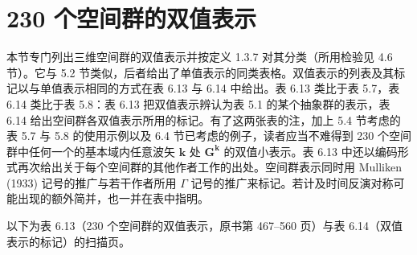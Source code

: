 \section{230 个空间群的双值表示}

本节专门列出三维空间群的双值表示并按定义 1.3.7 对其分类（所用检验见 4.6 节）。它与 5.2 节类似，后者给出了单值表示的同类表格。双值表示的列表及其标记以与单值表示相同的方式在表 6.13 与 6.14 中给出。表 6.13 类比于表 5.7，表 6.14 类比于表 5.8：表 6.13 把双值表示辨认为表 5.1 的某个抽象群的表示，表 6.14 给出空间群各双值表示所用的标记。有了这两张表的注，加上 5.4 节考虑的表 5.7 与 5.8 的使用示例以及 6.4 节已考虑的例子，读者应当不难得到 230 个空间群中任何一个的基本域内任意波矢 $\mathbf{k}$ 处 $\mathbf{G}^{\mathbf{k}}$ 的双值小表示。表 6.13 中还以编码形式再次给出关于每个空间群的其他作者工作的出处。空间群表示同时用 Mulliken (1933) 记号的推广与若干作者所用 $\Gamma$ 记号的推广来标记。若计及时间反演对称可能出现的额外简并，也一并在表中指明。

以下为表 6.13（230 个空间群的双值表示，原书第 467--560 页）与表 6.14（双值表示的标记）的扫描页。


